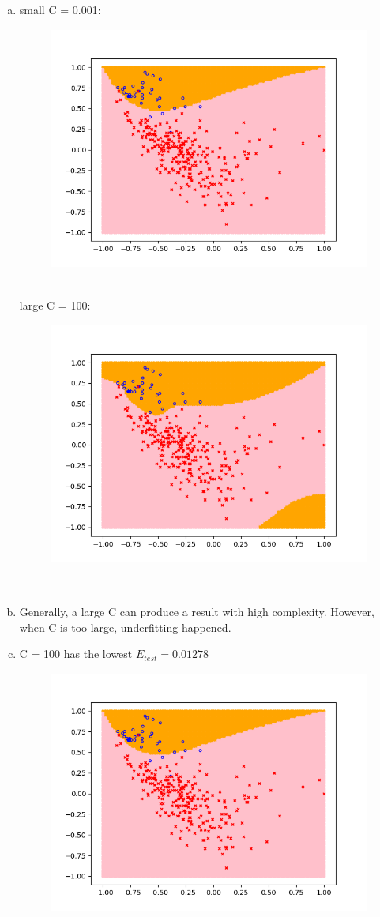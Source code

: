 \documentclass[11pt]{article}
\begin{document}
\newpage
{}
\begin{enumerate} [(a)]
	\item small C = 0.001:\begin{figure}[htb] 
			{\includegraphics[height=8cm]{p4a1.png}}
	\end{figure}\\
	large C = 100:\begin{figure}[htb] 
			{\includegraphics[height=8cm]{p4a2.png}}
	\end{figure}\\
	\newpage
	\item Generally, a large C can produce a result with high complexity. However, when C is too large, underfitting happened.
	\item C = 100 has the lowest $E_{test} = 0.01278$ \begin{figure}[htb] 
			{\includegraphics[height=8cm]{p4a1.png}}
	\end{figure}
\end{enumerate}
\end{document}
